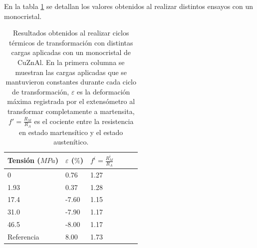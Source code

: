 \documentclass[a4paper,12pt,fleqn,twoside,openany]{book}
\begin{document}
 
    

    
    
En la tabla \ref{tab:TablaMonocristal} se detallan los valores obtenidos al realizar distintos ensayos con un monocristal.


\begin{table} 
\begin{center} 
\begin{tabular}{@{}llllll@{}} \toprule
Tensión ($MPa$) & $\varepsilon$ ($\%$) &  $f^i=\frac{R_M ^i}{R_A}$\\ \midrule
 0        &  0.76   & 1.27\\
 1.93       &  0.37   & 1.28\\
 17.4      &  -7.60  & 1.15\\
 31.0      &  -7.90  & 1.17\\
 46.5     &  -8.00  & 1.17  \\
 Referencia \cite{resistencia}    & 8.00  &  1.73   \\
 \bottomrule
\end{tabular}
\caption{Resultados obtenidos al realizar ciclos térmicos de transformación con distintas cargas aplicadas con un monocristal de CuZnAl. En la primera columna se muestran las cargas aplicadas que se mantuvieron constantes durante cada ciclo de transformación, $\varepsilon$ es la deformación máxima registrada por el extensómetro al transformar completamente a martensita, $f'=\frac{R_M}{R_A}$ es el cociente entre la resistencia en estado martensítico y el estado austenítico.}
\label{tab:TablaMonocristal}
\end{center}
\end{table}
\end{document}
